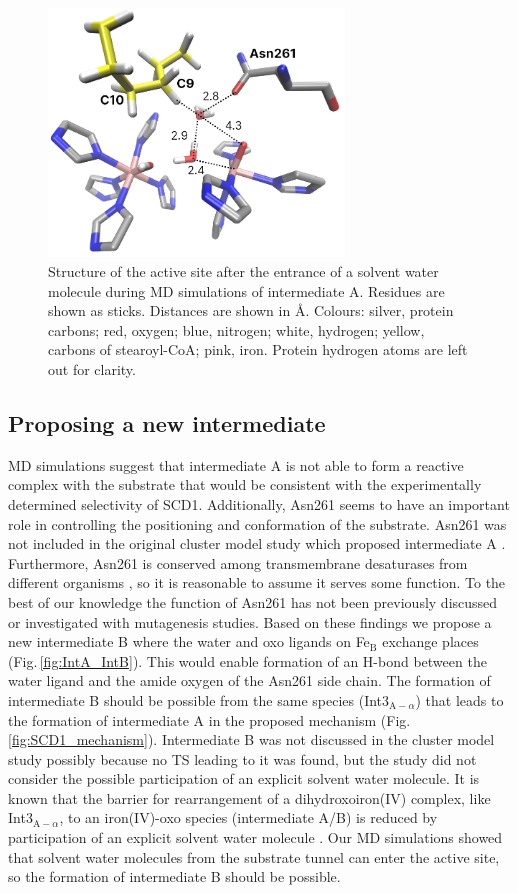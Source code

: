 \begin{figure}[!htb]
    \centering
    \includegraphics[width=0.7\textwidth]{Figures/int_A_run1.png}
    \caption{Structure of the active site after the entrance of a solvent water molecule during MD simulations of intermediate A. Residues are shown as sticks. Distances are shown in Å. Colours: silver, protein carbons; red, oxygen; blue, nitrogen; white, hydrogen; yellow, carbons of stearoyl-CoA; pink, iron. Protein hydrogen atoms are left out for clarity.}
    \label{fig:intA_run1}
\end{figure}

\subsection{Proposing a new intermediate}
MD simulations suggest that intermediate A is not able to form a reactive complex with the substrate that would be consistent with the experimentally determined selectivity of SCD1. Additionally, Asn261 seems to have an important role in controlling the positioning and conformation of the substrate. Asn261 was not included in the original cluster model study which proposed intermediate A \cite{Yu2019}. Furthermore, Asn261 is conserved among transmembrane desaturases from different organisms \cite{Bai2015}, so it is reasonable to assume it serves some function. To the best of our knowledge the function of Asn261 has not been previously discussed or investigated with mutagenesis studies. Based on these findings we propose a new intermediate B where the water and oxo ligands on Fe$_{\text{B}}$ exchange places (Fig.\,\ref{fig:IntA_IntB}). This would enable formation of an H-bond between the water ligand and the amide oxygen of the Asn261 side chain. The formation of intermediate B should be possible from the same species (Int3$_{\text{A}-\alpha}$) that leads to the formation of intermediate A in the proposed mechanism (Fig.\,\ref{fig:SCD1_mechanism}). Intermediate B was not discussed in the cluster model study possibly because no TS leading to it was found, but the study did not consider the possible participation of an explicit solvent water molecule. It is known that the barrier for rearrangement of a dihydroxoiron(IV) complex, like Int3$_{\text{A}-\alpha}$, to an iron(IV)-oxo species (intermediate A/B) is reduced by participation of an explicit solvent water molecule \cite{Petit2014}. Our MD simulations showed that solvent water molecules from the substrate tunnel can enter the active site, so the formation of intermediate B should be possible.


